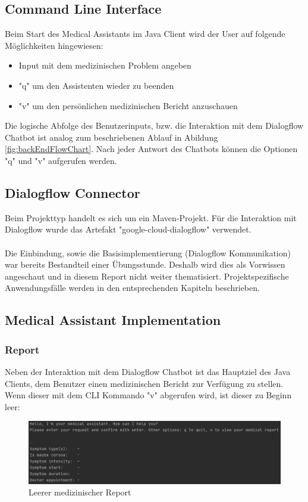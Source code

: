 \documentclass[11pt,a4paper]{article}
\begin{document}
	\subsection{Command Line Interface}
		Beim Start des Medical Assistants im Java Client wird der User auf folgende Möglichkeiten hingewiesen:
		\begin{itemize}
			\item Input mit dem medizinischen Problem angeben
			\item "q" um den Assistenten wieder zu beenden
			\item "v" um den persönlichen medizinischen Bericht anzuschauen
		\end{itemize}
		Die logische Abfolge des Benutzerinputs, bzw. die Interaktion mit dem Dialogflow Chatbot ist analog zum beschriebenen Ablauf in Abildung \ref{fig:backEndFlowChart}. Nach jeder Antwort des Chatbots können die Optionen "q" und "v" aufgerufen werden.
	
	\subsection{Dialogflow Connector}
		Beim Projekttyp handelt es sich um ein Maven-Projekt. Für die Interaktion mit Dialogflow wurde das Artefakt "google-cloud-dialogflow" verwendet.
		
		\paragraph{}
		Die Einbindung, sowie die Basisimplementierung (Dialogflow Kommunikation) war bereits Bestandteil einer Übungsstunde. Deshalb wird dies als Vorwissen angeschaut und in diesem Report nicht weiter thematisiert. Projektspezifische Anwendungsfälle werden in den entsprechenden Kapiteln beschrieben.
	
	\subsection{Medical Assistant Implementation}
		\subsubsection{Report}
			Neben der Interaktion mit dem Dialogflow Chatbot ist das Hauptziel des Java Clients, dem Benutzer einen medizinischen Bericht zur Verfügung zu stellen. Wenn dieser mit dem CLI Kommando "v" abgerufen wird, ist dieser zu Beginn leer:
			\begin{figure}[h!]
				\begin{center}
            		\includegraphics[width=0.85\linewidth]{JavaClient-EmptyReport.png}
		            \caption{Leerer medizinischer Report}
		            \label{fig:javaClient_emptyReport}
				\end{center}
	        \end{figure}
	        
\end{document}
